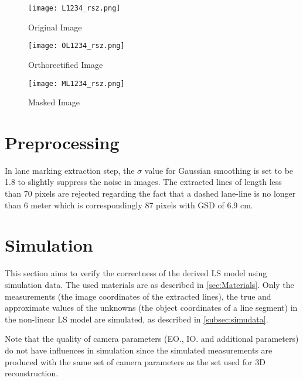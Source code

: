 \begin{figure}%
  \parbox{.475\linewidth}{
    \centering
    \texttt{[image: L1234\_rsz.png]}
    \caption{\small Original Image}
    \label{fig:OriImg}
  }
  \quad
  \parbox{.475\linewidth}{
    \centering
    \texttt{[image: OL1234\_rsz.png]}
    \caption{\small Orthorectified Image}
    \label{fig:OrthoImg}
  }
  \centering
  \parbox{.7\linewidth}{
    \texttt{[image: ML1234\_rsz.png]}
    \caption{\small Masked Image}
    \label{fig:MaskedImg}
  }
\end{figure}

\clearpage
\section{Preprocessing}
\label{sec:preprocessing}

In lane marking extraction step, the $\sigma$ value for Gaussian smoothing is set to be 1.8 %
to slightly suppress the noise in images.
The extracted lines of length less than 70 pixels are rejected %
regarding the fact that a dashed lane-line is no longer than 6 meter which is correspondingly 87 pixels with GSD of 6.9 cm.

\section{Simulation}
\label{sec:simulation}
This section aims to verify the correctness of the derived LS model using simulation data. The used materials are as described in \cref{sec:Materials}. Only the measurements (the image coordinates of the extracted lines), the true and approximate values of the unknowns (the object coordinates of a line segment) in the non-linear LS model are simulated, as described in \cref{subsec:simudata}.

Note that the quality of camera parameters (EO., IO. and additional parameters) do not have influences in simulation since the simulated measurements are produced with the same set of camera parameters as the set used for 3D reconstruction.

